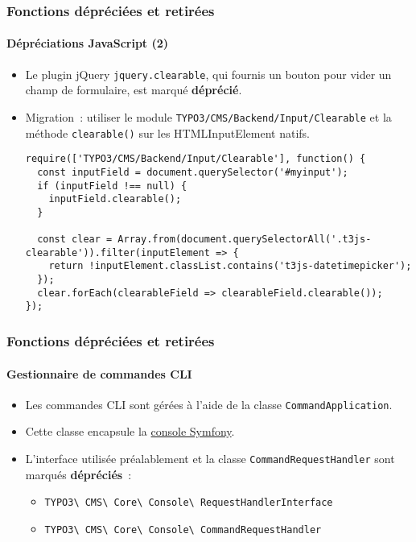 \begin{frame}[fragile]
	\frametitle{Fonctions dépréciées et retirées}
	\framesubtitle{Dépréciations JavaScript (2)}

	\lstset{basicstyle=\tiny\ttfamily}

	\begin{itemize}
		\item Le plugin jQuery \texttt{jquery.clearable},
			qui fournis un bouton pour vider un champ de formulaire, est marqué \textbf{déprécié}.
		\item Migration~: utiliser le module \small\texttt{TYPO3/CMS/Backend/Input/Clearable}\normalsize
			et la méthode \texttt{clearable()} sur les HTMLInputElement natifs.

\begin{lstlisting}
require(['TYPO3/CMS/Backend/Input/Clearable'], function() {
  const inputField = document.querySelector('#myinput');
  if (inputField !== null) {
    inputField.clearable();
  }

  const clear = Array.from(document.querySelectorAll('.t3js-clearable')).filter(inputElement => {
    return !inputElement.classList.contains('t3js-datetimepicker');
  });
  clear.forEach(clearableField => clearableField.clearable());
});
\end{lstlisting}

	\end{itemize}

\end{frame}


\begin{frame}[fragile]
	\frametitle{Fonctions dépréciées et retirées}
	\framesubtitle{Gestionnaire de commandes CLI}

	\begin{itemize}
		\item Les commandes CLI sont gérées à l'aide de la classe \texttt{CommandApplication}.
		\item Cette classe encapsule la
			\href{https://symfony.com/doc/current/components/console.html}{console Symfony}.

		\item L'interface utilisée préalablement et la classe \texttt{CommandRequestHandler}
			sont marqués \textbf{dépréciés}~:

			\begin{itemize}
				\item
					\texttt{TYPO3\textbackslash
						CMS\textbackslash
						Core\textbackslash
						Console\textbackslash
						RequestHandlerInterface}
				\item
					\texttt{TYPO3\textbackslash
						CMS\textbackslash
						Core\textbackslash
						Console\textbackslash
						CommandRequestHandler}
			\end{itemize}

	\end{itemize}

\end{frame}

